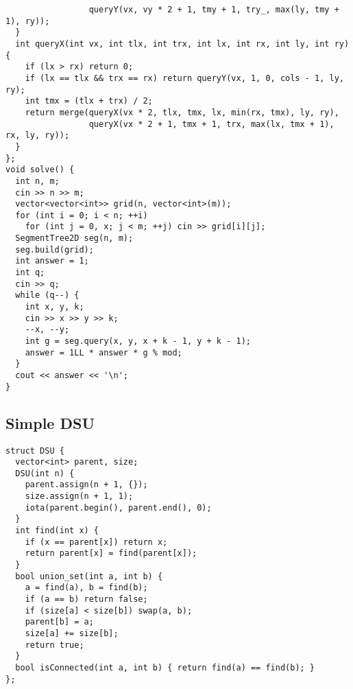 \documentclass[twoside]{article}
\begin{document}
\begin{multicols*}{2}
\begin{verbatim}
                 queryY(vx, vy * 2 + 1, tmy + 1, try_, max(ly, tmy + 1), ry));
  }
  int queryX(int vx, int tlx, int trx, int lx, int rx, int ly, int ry) {
    if (lx > rx) return 0;
    if (lx == tlx && trx == rx) return queryY(vx, 1, 0, cols - 1, ly, ry);
    int tmx = (tlx + trx) / 2;
    return merge(queryX(vx * 2, tlx, tmx, lx, min(rx, tmx), ly, ry),
                 queryX(vx * 2 + 1, tmx + 1, trx, max(lx, tmx + 1), rx, ly, ry));
  }
};
void solve() {
  int n, m;
  cin >> n >> m;
  vector<vector<int>> grid(n, vector<int>(m));
  for (int i = 0; i < n; ++i)
    for (int j = 0, x; j < m; ++j) cin >> grid[i][j];
  SegmentTree2D seg(n, m);
  seg.build(grid);
  int answer = 1;
  int q;
  cin >> q;
  while (q--) {
    int x, y, k;
    cin >> x >> y >> k;
    --x, --y;
    int g = seg.query(x, y, x + k - 1, y + k - 1);
    answer = 1LL * answer * g % mod;
  }
  cout << answer << '\n';
}
\end{verbatim}

{
\subsection*{Simple DSU}
}
\begin{verbatim}
struct DSU {
  vector<int> parent, size;
  DSU(int n) {
    parent.assign(n + 1, {});
    size.assign(n + 1, 1);
    iota(parent.begin(), parent.end(), 0);
  }
  int find(int x) {
    if (x == parent[x]) return x;
    return parent[x] = find(parent[x]);
  }
  bool union_set(int a, int b) {
    a = find(a), b = find(b);
    if (a == b) return false;
    if (size[a] < size[b]) swap(a, b);
    parent[b] = a;
    size[a] += size[b];
    return true;
  }
  bool isConnected(int a, int b) { return find(a) == find(b); }
};

\end{verbatim}

{
}
\end{multicols*}
\end{document}
